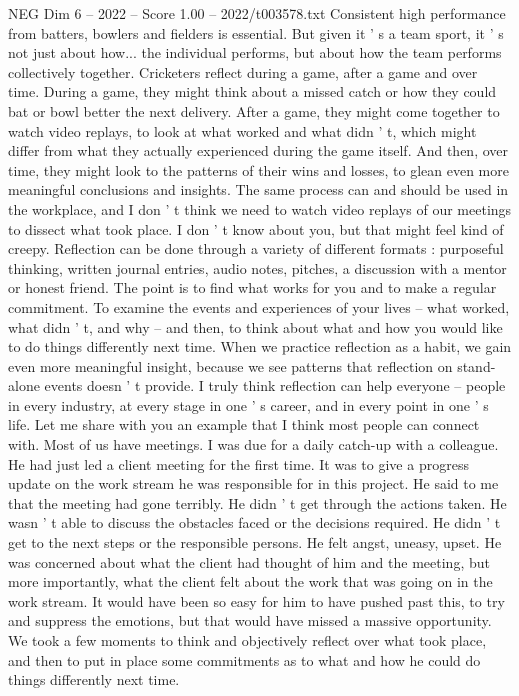 \begin{textsample}{NEG Dim 6 – 2022 – Score 1.00 – 2022/t003578.txt}
Consistent high performance from batters, bowlers and fielders is essential.
But given it ' s a team sport, it ' s not just about how... the individual performs, but about how the team performs collectively together.
Cricketers reflect during a game, after a game and over time.
During a game, they might think about a missed catch or how they could bat or bowl better the next delivery.
After a game, they might come together to watch video replays, to look at what worked and what didn ' t, which might differ from what they actually experienced during the game itself.
And then, over time, they might look to the patterns of their wins and losses, to glean even more meaningful conclusions and insights.
The same process can and should be used in the workplace, and I don ' t think we need to watch video replays of our meetings to dissect what took place.
I don ' t know about you, but that might feel kind of creepy.
Reflection can be done through a variety of different formats : purposeful thinking, written journal entries, audio notes, pitches, a discussion with a mentor or honest friend.
The point is to find what works for you and to make a regular commitment.
To examine the events and experiences of your lives -- what worked, what didn ' t, and why -- and then, to think about what and how you would like to do things differently next time.
When we practice reflection as a habit, we gain even more meaningful insight, because we see patterns that reflection on stand-alone events doesn ' t provide.
I truly think reflection can help everyone -- people in every industry, at every stage in one ' s career, and in every point in one ' s life.
Let me share with you an example that I think most people can connect with.
Most of us have meetings.
I was due for a daily catch-up with a colleague.
He had just led a client meeting for the first time.
It was to give a progress update on the work stream he was responsible for in this project.
He said to me that the meeting had gone terribly.
He didn ' t get through the actions taken.
He wasn ' t able to discuss the obstacles faced or the decisions required.
He didn ' t get to the next steps or the responsible persons.
He felt angst, uneasy, upset.
He was concerned about what the client had thought of him and the meeting, but more importantly, what the client felt about the work that was going on in the work stream.
It would have been so easy for him to have pushed past this, to try and suppress the emotions, but that would have missed a massive opportunity.
We took a few moments to think and objectively reflect over what took place, and then to put in place some commitments as to what and how he could do things differently next time.

\end{textsample}
